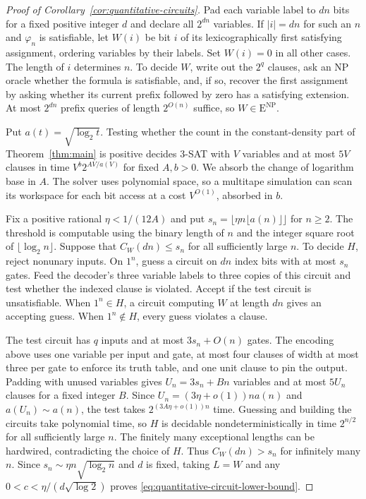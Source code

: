 \begin{proof}[Proof of Corollary~\ref{cor:quantitative-circuits}]
Pad each variable label to $dn$ bits for a fixed positive integer $d$
and declare all $2^{dn}$ variables. If $|i|=dn$ for such an $n$ and
$\varphi_n$ is satisfiable, let $W(i)$ be bit $i$ of its
lexicographically first satisfying assignment, ordering variables by
their labels. Set $W(i)=0$ in all other cases. The length of $i$
determines $n$. To decide $W$, write out the $2^q$ clauses, ask
an NP oracle whether the formula is satisfiable, and, if so,
recover the first assignment by asking whether its current prefix
followed by zero has a satisfying extension. At most $2^{dn}$ prefix
queries of length $2^{O(n)}$ suffice, so $W\in\mathrm E^{\mathrm{NP}}$.

Put $a(t)=\sqrt{\log_2 t}$. Testing whether the count in the
constant-density part of Theorem~\ref{thm:main} is positive
decides $3$-SAT with $V$ variables and at most $5V$ clauses in time
$V^b2^{A V/a(V)}$ for fixed $A,b>0$. We absorb the change of
logarithm base in $A$. The solver uses polynomial space, so a
multitape simulation can scan its workspace for each bit access at
a cost $V^{O(1)}$, absorbed in $b$.

Fix a positive rational $\eta<1/(12A)$ and put
$s_n=\lfloor\eta n\lfloor a(n)\rfloor\rfloor$ for $n\ge2$.
The threshold is computable using the binary length of $n$ and the
integer square root of $\lfloor\log_2 n\rfloor$. Suppose that
$C_W(dn)\le s_n$ for all sufficiently large $n$. To decide $H$,
reject nonunary inputs. On $1^n$, guess a circuit on $dn$ index bits
with at most $s_n$ gates. Feed the decoder's three variable labels to
three copies of this circuit and test whether the indexed clause is
violated. Accept if the test circuit is unsatisfiable. When
$1^n\in H$, a circuit computing $W$ at length $dn$ gives an
accepting guess. When $1^n\notin H$, every guess violates a clause.

The test circuit has $q$ inputs and at most $3s_n+O(n)$ gates. The
encoding above uses one variable per input and gate, at most four
clauses of width at most three per gate to enforce its truth table,
and one unit clause to pin the output. Padding with unused variables
gives $U_n=3s_n+Bn$ variables and at most $5U_n$ clauses for a fixed
integer $B$. Since $U_n=(3\eta+o(1))n a(n)$ and $a(U_n)\sim a(n)$,
the test takes $2^{(3A\eta+o(1))n}$ time. Guessing and building the
circuits take polynomial time, so $H$ is decidable nondeterministically
in time $2^{n/2}$ for all sufficiently large $n$. The finitely many
exceptional lengths can be hardwired, contradicting the choice of $H$.
Thus $C_W(dn)>s_n$ for infinitely many $n$. Since
$s_n\sim\eta n\sqrt{\log_2 n}$ and $d$ is fixed, taking $L=W$ and any
$0<c<\eta/(d\sqrt{\log 2})$ proves \eqref{eq:quantitative-circuit-lower-bound}.
\end{proof}
